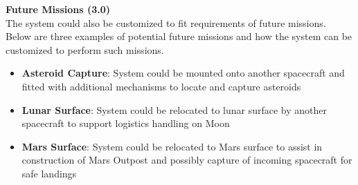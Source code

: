 \documentclass[12pt, letter]{article}
\begin{document}
\textbf{Future Missions (3.0)}\\
The system could also be customized to fit requirements of future missions. Below are three examples of potential future missions and how the system can be customized to perform such missions.
\begin{itemize}
\item{\textbf{Asteroid Capture}: System could be mounted onto another spacecraft and fitted with additional mechanisms to locate and capture asteroids}
\item{\textbf{Lunar Surface}: System could be relocated to lunar surface by another spacecraft to support logistics handling on Moon}
\item{\textbf{Mars Surface}: System could be relocated to Mars surface to assist in construction of Mars Outpost and possibly capture of incoming spacecraft for safe landings}
\end{itemize}


\newpage



\newpage
\appendix
\end{document}

